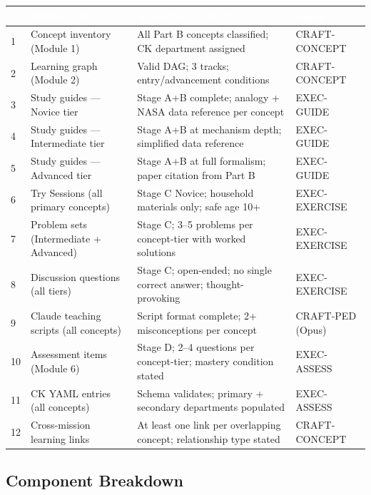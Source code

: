 \documentclass[11pt,letterpaper]{article}
\newcommand{\tableheader}[1]{\textbf{\sffamily\textcolor{white}{#1}}}
\begin{document}
\begin{center}
\begin{tabularx}{\textwidth}{C{0.5cm}L{4cm}L{3cm}X}
\toprule
{}
\tableheader{\#} & \tableheader{Deliverable} & \tableheader{Acceptance Criteria} & \tableheader{Agent} \\
 & Concept inventory (Module 1) & All Part B concepts classified; CK department assigned & CRAFT-CONCEPT \\
2 & Learning graph (Module 2) & Valid DAG; 3 tracks; entry/advancement conditions & CRAFT-CONCEPT \\
3 & Study guides — Novice tier & Stage A+B complete; analogy + NASA data reference per concept & EXEC-GUIDE \\
4 & Study guides — Intermediate tier & Stage A+B at mechanism depth; simplified data reference & EXEC-GUIDE \\
5 & Study guides — Advanced tier & Stage A+B at full formalism; paper citation from Part B & EXEC-GUIDE \\
6 & Try Sessions (all primary concepts) & Stage C Novice; household materials only; safe age 10+ & EXEC-EXERCISE \\
7 & Problem sets (Intermediate + Advanced) & Stage C; 3--5 problems per concept-tier with worked solutions & EXEC-EXERCISE \\
8 & Discussion questions (all tiers) & Stage C; open-ended; no single correct answer; thought-provoking & EXEC-EXERCISE \\
9 & Claude teaching scripts (all concepts) & Script format complete; 2+ misconceptions per concept & CRAFT-PED (Opus) \\
10 & Assessment items (Module 6) & Stage D; 2--4 questions per concept-tier; mastery condition stated & EXEC-ASSESS \\
11 & CK YAML entries (all concepts) & Schema validates; primary + secondary departments populated & EXEC-ASSESS \\
12 & Cross-mission learning links & At least one link per overlapping concept; relationship type stated & CRAFT-CONCEPT \\
\bottomrule
\end{tabularx}
\end{center}

\subsection{Component Breakdown}
\end{document}
